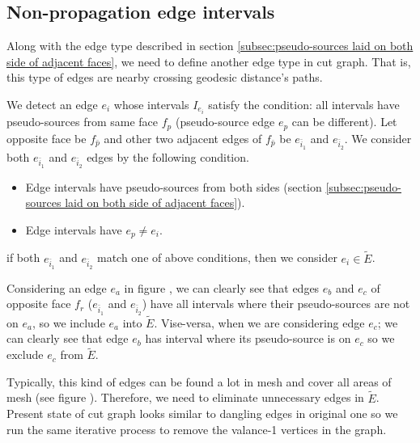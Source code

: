 \documentclass[a4paper,twoside]{article}
\begin{document}
\subsection{Non-propagation edge intervals}
\label{subsec:intervals fail to propagate}
Along with the edge type described in section \ref{subsec:pseudo-sources laid on both side of adjacent faces},  we need to define another edge type in cut graph. That is, this type of edges are nearby crossing geodesic distance's paths.

We detect an edge $e_i$ whose intervals $I_{e_i}$ satisfy the condition: all intervals have pseudo-sources from same face $f_p$ (pseudo-source edge $e_p$ can be different). Let opposite face be $f_{\bar{p}}$ and other two adjacent edges of $f_{\bar{p}}$ be $e_{\bar{i}_1}$ and $e_{\bar{i}_2}$. We consider both $e_{\bar{i}_1}$ and $e_{\bar{i}_2}$ edges by the following condition.
\begin{itemize}
	\item Edge intervals have pseudo-sources from both sides (section \ref{subsec:pseudo-sources laid on both side of adjacent faces}).
	\item Edge intervals have $e_p \neq e_i$.
\end{itemize}

if both $e_{\bar{i}_1}$ and $e_{\bar{i}_2}$ match one of above conditions, then we consider $e_i \in \tilde{E}$. 

Considering an edge $e_a$ in figure , we can clearly see that edges $e_b$ and $e_c$ of opposite face $f_r$ ($e_{\bar{i}_1}$ and $e_{\bar{i}_2}$) have all intervals where their pseudo-sources are not on $e_a$, so we include $e_a$ into $\tilde{E}$. Vise-versa, when we are considering edge $e_c$; we can clearly see that edge $e_b$ has interval where its pseudo-source is on $e_c$ so we exclude $e_c$ from $\tilde{E}$.

Typically, this kind of edges can be found a lot in mesh and cover all areas of mesh (see figure ). Therefore, we need to eliminate unnecessary edges in $\tilde{E}$. Present state of cut graph looks similar to dangling edges in original one so we run the same iterative process to remove the valance-1 vertices in the graph. 
\end{document}
